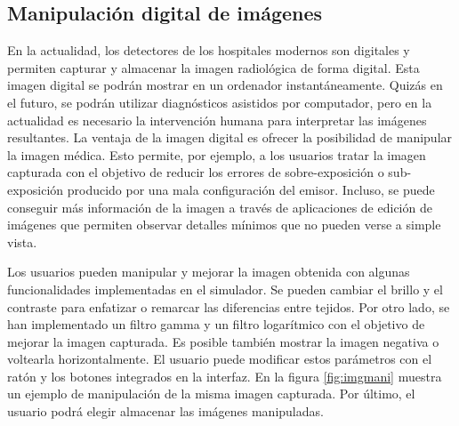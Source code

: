 \subsection{Manipulación digital de imágenes}
\label{xray:ajustes}

En la actualidad, los detectores de los hospitales modernos son digitales y permiten capturar y almacenar la imagen radiológica de forma digital. Esta imagen digital se podrán mostrar en un ordenador instantáneamente. Quizás en el futuro, se podrán utilizar diagnósticos asistidos por computador, pero en la actualidad es necesario la intervención humana para interpretar las imágenes resultantes. La ventaja de la imagen digital es ofrecer la posibilidad de manipular la imagen médica. Esto permite, por ejemplo, a los usuarios tratar la imagen capturada con el objetivo de reducir los errores de sobre-exposición o sub-exposición producido por una mala configuración del emisor. Incluso, se puede conseguir más información de la imagen a través de aplicaciones de edición de imágenes que permiten observar detalles mínimos que no pueden verse a simple vista.  

Los usuarios pueden manipular y mejorar la imagen obtenida con algunas funcionalidades implementadas en el simulador. Se pueden cambiar el brillo y el contraste para enfatizar o remarcar las diferencias entre tejidos. Por otro lado, se han implementado un filtro gamma y un filtro logarítmico con el objetivo de mejorar la imagen capturada. Es posible también mostrar la imagen negativa o voltearla horizontalmente. El usuario puede modificar estos parámetros con el ratón y los botones integrados en la interfaz. En la figura \ref{fig:imgmani} muestra un ejemplo de manipulación de la misma imagen capturada. Por último, el usuario podrá elegir almacenar las imágenes manipuladas.%




